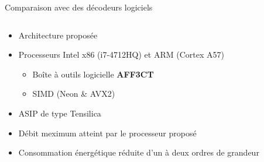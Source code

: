 \begin{frame}[c]{Comparaison avec des décodeurs logiciels}
  \begin{columns}[T] %
  \begin{column}{.48\textwidth}
    \begin{itemize}
      \item<+-> Architecture proposée
      \item<+-> Processeurs Intel x86 (i7-4712HQ) et ARM (Cortex A57)
      \begin{itemize}
        \item<+-> Boîte à outils logicielle \textbf{AFF3CT}
        \item<+-> SIMD (Neon \& AVX2)
      \end{itemize}
      \item<+-> ASIP de type Tensilica
      \item<+-> Débit meximum atteint par le processeur proposé
      \item<+-> Consommation énergétique réduite d'un à deux ordres de grandeur
    \end{itemize}
  \end{column}

  \begin{column}{.48\textwidth}
\end{column}
\end{columns}
\end{frame}
